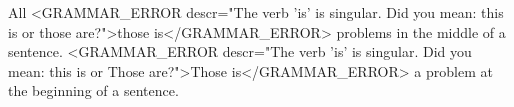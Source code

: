 
    All <GRAMMAR_ERROR descr="The verb 'is' is singular. Did you mean: this is or those are?">those is</GRAMMAR_ERROR> problems in the middle of a sentence.
    <GRAMMAR_ERROR descr="The verb 'is' is singular. Did you mean: this is or Those are?">Those is</GRAMMAR_ERROR> a problem at the beginning of a sentence.
